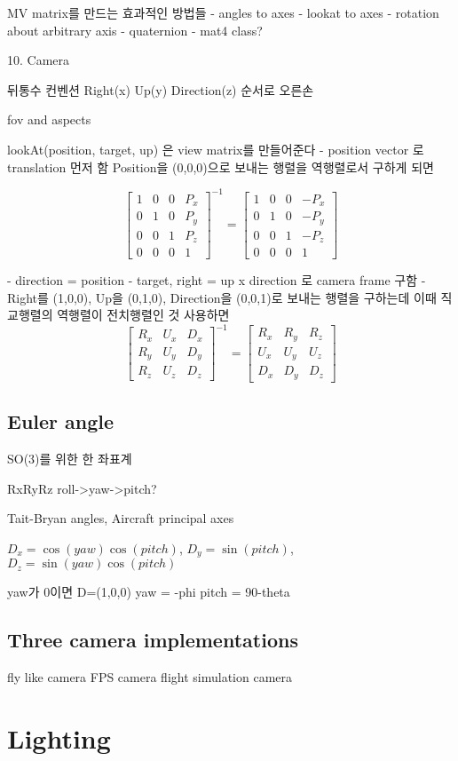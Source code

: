 \documentclass[a4paper]{report}
\begin{document}
MV matrix를 만드는 효과적인 방법들
- angles to axes
- lookat to axes
- rotation about arbitrary axis
- quaternion
- mat4 class?



10. Camera

뒤통수 컨벤션
Right(x) Up(y) Direction(z) 순서로 오른손


fov and aspects


lookAt(position, target, up)
은 view matrix를 만들어준다
- position vector 로 translation 먼저 함 Position을 (0,0,0)으로 보내는 행렬을 역행렬로서 구하게 되면

\[\begin{bmatrix}1&0&0&P_x\\0&1&0&P_y\\0&0&1&P_z\\0&0&0&1\end{bmatrix}^{-1}=\begin{bmatrix}1&0&0&-P_x\\0&1&0&-P_y\\0&0&1&-P_z\\0&0&0&1\end{bmatrix}\]

- direction = position - target, right = up x direction 로 camera frame 구함
- Right를 (1,0,0), Up을 (0,1,0), Direction을 (0,0,1)로 보내는 행렬을 구하는데 이때 직교행렬의 역행렬이 전치행렬인 것 사용하면
\[\begin{bmatrix}R_x&U_x&D_x\\R_y&U_y&D_y\\R_z&U_z&D_z\end{bmatrix}^{-1}=\begin{bmatrix}R_x&R_y&R_z\\U_x&U_y&U_z\\D_x&D_y&D_z\end{bmatrix}\]


\section{Euler angle}
SO(3)를 위한 한 좌표계


RxRyRz
roll->yaw->pitch?

Tait-Bryan angles, Aircraft principal axes

$D_x=\cos(yaw)\cos(pitch)$,
$D_y=\sin(pitch)$,
$D_z=\sin(yaw)\cos(pitch)$

yaw가 0이면 D=(1,0,0)
yaw = -phi
pitch = 90-theta

\section{Three camera implementations}
fly like camera
FPS camera
flight simulation camera





\chapter{Lighting}
\end{document}
